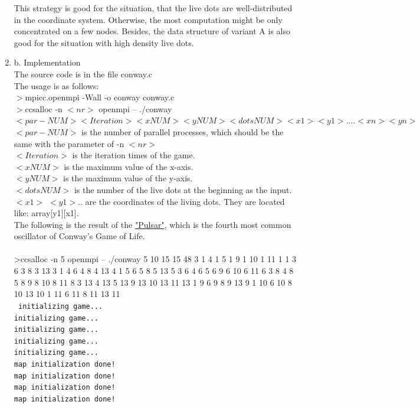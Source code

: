 \documentclass[a4paper, 14pt]{article}
\begin{document}
\begin{enumerate}
This strategy is good for the situation, that the live dots are well-distributed in the coordinate system. Otherwise, the most computation might be only concentrated on a few nodes.
Besides, the data structure of variant A is also good for the situation with high density live dots.

\item{b. Implementation} \\
The source code is in the file conway.c \\
The usage is as follows: \\
$>$mpicc.openmpi -Wall -o conway conway.c \\
$>$ccsalloc -n $<nr>$ openmpi -- ./conway $<par-NUM> <Iteration> <xNUM> <yNUM> <dotsNUM> <x1> <y1>....<xn> <yn>$ \\
$<par-NUM>$ is the number of parallel processes, which should be the same with the parameter of -n $<nr>$\\
$<Iteration>$ is the iteration times of the game.\\
$<xNUM>$ is the maximum value of the x-axis.\\
$<yNUM>$ is the maximum value of the y-axis.\\
$<dotsNUM>$ is the number of the live dots at the beginning as the input.\\
$<x1>$ $<y1>$.. are the coordinates of the living dots. They are located like: array[y1][x1]. \\
The following is the result of the \href{http://www.conwaylife.com/wiki/Pulsar}{"Pulsar"}, which is the fourth most common oscillator of Conway's Game of Life. \\
\\
>ccsalloc -n 5 openmpi -- ./conway 5 10 15 15 48 3 1 4 1 5 1 9 1 10 1 11 1 1 3 6 3 8 3 13 3 1 4 6 4 8 4 13 4 1 5 6 5 8 5 13 5 3 6 4 6 5 6 9 6 10 6 11 6 3 8 4 8 5 8 9 8 10 8 11 8 3 13 4 13 5 13 9 13 10 13 11 13 1 9 6 9 8 9 13 9 1 10 6 10 8 10 13 10 1 11 6 11 8 11 13 11
\\ 
\texttt{
initializing game...\\
initializing game...\\
initializing game...\\
initializing game...\\
initializing game...\\
map initialization done!\\
map initialization done!\\
map initialization done!\\
map initialization done!\\
}
\end{enumerate}
\end{document}
